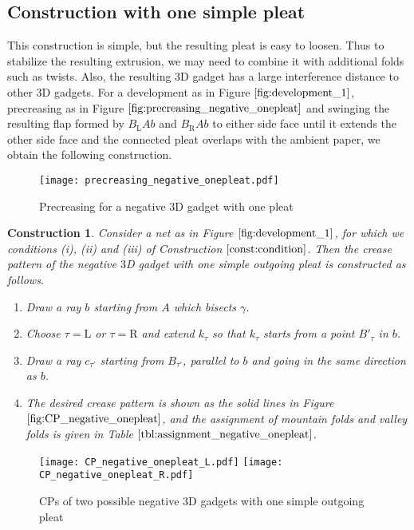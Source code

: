 \documentclass[11pt]{amsart}
\newtheorem{construction}[theorem]{Construction}
\numberwithin{equation}{section}
\numberwithin{theorem}{section}
\newcommand{\Lt}{\ensuremath{\mathrm{L}}}
\newcommand{\Rt}{\ensuremath{\mathrm{R}}}
\begin{document}
\subsection{Construction with one simple pleat}\label{subsec:negative_onepleat}
This construction is simple, but the resulting pleat is easy to loosen.
Thus to stabilize the resulting extrusion, we may need to combine it with additional folds such as twists.
Also, the resulting $3$D gadget has a large interference distance to other $3$D gadgets.
For a development as in Figure $\ref{fig:development_1}$, precreasing as in Figure $\ref{fig:precreasing_negative_onepleat}$ and swinging the resulting flap
formed by $B_\Lt Ab$ and $B_\Rt Ab$ to either side face until it extends the other side face and the connected pleat overlaps with the ambient paper,
we obtain the following construction.
\begin{figure}[htbp]
\addtocounter{theorem}{1}
\centering\texttt{[image: precreasing\_negative\_onepleat.pdf]}
    \caption{Precreasing for a negative $3$D gadget with one pleat}
    \label{fig:precreasing_negative_onepleat}
\end{figure}
\begin{construction}\label{const:negative_onepleat}\rm
Consider a net as in Figure $\ref{fig:development_1}$, for which we conditions (i), (ii) and (iii) of Construction $\ref{const:condition}$.
Then the crease pattern of the negative $3$D gadget with one simple outgoing pleat is constructed as follows.
\begin{enumerate}[(1)]
\item Draw a ray $b$ starting from $A$ which bisects $\gamma$.
\item Choose $\tau =\Lt$ or $\tau =\Rt$ and extend $k_\tau$ so that $k_\tau$ starts from a point $B'_\tau$ in $b$.
\item Draw a ray $c_{\tau'}$ starting from $B_{\tau'}$, parallel to $b$ and going in the same direction as $b$.
\item The desired crease pattern is shown as the solid lines in Figure $\ref{fig:CP_negative_onepleat}$,
and the assignment of mountain folds and valley folds is given in Table $\ref{tbl:assignment_negative_onepleat}$.
\end{enumerate}
\end{construction}
\begin{figure}[htbp]
\addtocounter{theorem}{1}
\centering
\texttt{[image: CP\_negative\_onepleat\_L.pdf]}
\texttt{[image: CP\_negative\_onepleat\_R.pdf]}
    \caption{CPs of two possible negative $3$D gadgets with one simple outgoing pleat}
    \label{fig:CP_negative_onepleat}
\end{figure}
\end{document}
